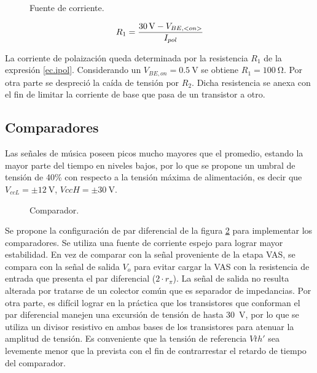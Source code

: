 	\begin{figure}[H]
		\centering
		\scalebox{0.5}{}
		\caption{Fuente de corriente.}
		\label{fig.fte}
	\end{figure}

\begin{equation}
	\centering
	R_1 = \frac{\SI{30}{\volt} - V_{BE, <on>} }{ I_{pol} }
	\label{ec.ipol}
\end{equation}

La corriente de polaización queda determinada por la resistencia $R_1$ de la expresión \ref{ec.ipol}. Considerando un $V_{BE,on} = \SI{0.5}{\volt}$ se obtiene $R_1 = \SI{100}{\ohm}$. Por otra parte se despreció la caída de tensión por $R_2$. Dicha resistencia se anexa con el fin de limitar la corriente de base que pasa de un transistor a otro.


\subsection{Comparadores}

	Las señales de música poseen picos mucho mayores que el promedio, estando la mayor parte del tiempo en niveles bajos, por lo que se propone un umbral de tensión de 40\% con respecto a la tensión máxima de alimentación, es decir que $V_{ccL} = \pm \SI{12}{\volt}$, $VccH = \pm \SI{30}{\volt}$. 

	\begin{figure}[H]
		\centering
		\scalebox{0.5}{}
		\caption{Comparador.}
		\label{fig.comparador}
	\end{figure}

	Se propone la configuración de par diferencial de la figura \ref{fig.comparador} para implementar los comparadores. Se utiliza una fuente de corriente espejo para lograr mayor estabilidad. En vez de comparar con la señal proveniente de la etapa VAS, se compara con la señal de salida $V_{o}$ para evitar cargar la VAS con la resistencia de entrada que presenta el par diferencial ($2\cdot r_\pi$). La señal de salida no resulta alterada por tratarse de un colector común que es separador de impedancias.
	Por otra parte, es difícil lograr en la práctica que los transistores que conforman el par diferencial manejen una excursión de tensión de hasta \SI{30}{\volt}, por lo que se utiliza un divisor resistivo en ambas bases de los transistores para atenuar la amplitud de tensión. Es conveniente que la tensión de referencia $Vth'$ sea levemente menor que la prevista con el fin de contrarrestar el retardo de tiempo del comparador.

